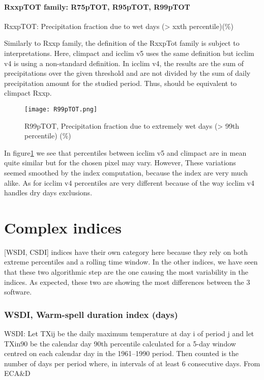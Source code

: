 \documentclass[a4paper,11pt]{article}
\begin{document}
\subsection{RxxpTOT family: R75pTOT, R95pTOT, R99pTOT}
    RxxpTOT: Precipitation fraction due to wet days (> xxth percentile)(\%)

    Similarly to Rxxp family, the definition of the RxxpTot family is subject to interpretations. Here, climpact and icclim v5 uses the same definition but icclim v4 is using a non-standard definition. In icclim v4, the results are the sum of precipitations over the given threshold and are not divided by the sum of daily precipitation amount for the studied period. Thus, should be equivalent to climpact Rxxp.

    \begin{figure}
        \centering
        \texttt{[image: R99pTOT.png]}
        \caption{R99pTOT, Precipitation fraction due to extremely wet days (> 99th percentile) (\%)}
        \label{figure/r99ptot}
    \end{figure}

    In figure\ref{figure/r99ptot} we see that percentiles between icclim v5 and climpact are in mean quite similar but for the chosen pixel may vary.
    However, These variations seemed smoothed by the index computation, because the index are very much alike.
    As for icclim v4 percentiles are very different because of the way icclim v4 handles dry days exclusions.  


\part{Complex indices}
    [WSDI, CSDI] indices have their own category here because they rely on both extreme percentiles and a rolling time window.
    In the other indices, we have seen that these two algorithmic step are the one causing the most variability in the indices.
    As expected, these two are showing the most differences between the 3 software.

\section{WSDI, Warm-spell duration index (days)}
    WSDI: Let TXij be the daily maximum temperature at day i of period j and let
    TXin90 be the calendar day 90th percentile calculated for a 5-day window
    centred on each calendar day in the 1961–1990 period. Then counted is the
    number of days per period where, in intervals of at least 6 consecutive days. From ECA\&D\cite{doc/ecad_old}
\end{document}
